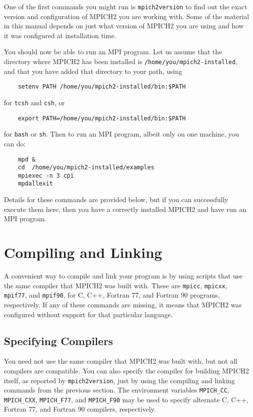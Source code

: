 \documentclass[dvipdfm,11pt]{article}
\begin{document}
One of the first commands you might run is \texttt{mpich2version} to
find out the exact version and configuration of MPICH2 you are working
with.  Some of the material in this manual depends on just what version
of MPICH2 you are using and how it was configured at installation time.

You should now be able to run an MPI program.  Let us assume that the
directory where MPICH2 has been installed is
\texttt{/home/you/mpich2-installed}, and that you have added that directory to
your path, using 
\begin{verbatim}
    setenv PATH /home/you/mpich2-installed/bin:$PATH
\end{verbatim}
for \texttt{tcsh} and \texttt{csh}, or 
\begin{verbatim}
    export PATH=/home/you/mpich2-installed/bin:$PATH
\end{verbatim}
for \texttt{bash} or \texttt{sh}.
Then to run an MPI program, albeit only on one machine, you can do:
\begin{verbatim}
    mpd &
    cd  /home/you/mpich2-installed/examples
    mpiexec -n 3 cpi
    mpdallexit
\end{verbatim}
Details for these commands are provided below, but if you can
successfully execute them here, then you have a correctly installed
MPICH2 and have run an MPI program. 

\section{Compiling and Linking}
\label{sec:compiling}

A convenient way to compile and link your program is by using scripts
that use the same compiler that MPICH2 was built with.  These are
\texttt{mpicc}, \texttt{mpicxx}, \texttt{mpif77}, and \texttt{mpif90},
for C, C++, Fortran 77, and Fortran 90 programs, respectively.  If any
of these commands are missing, it means that MPICH2 was configured
without support for that particular language.

\subsection{Specifying Compilers}
\label{sec:specifying-compilers}

You need not use the same compiler that MPICH2 was built with, but not
all compilers are compatible.  You can also specify the compiler for
building MPICH2 itself, as reported by \texttt{mpich2version}, just by
using the compiling and linking commands from the previous section.
The environment variables \texttt{MPICH\_CC}, \texttt{MPICH\_CXX},
\texttt{MPICH\_F77}, and \texttt{MPICH\_F90} may be used to specify
alternate C, C++, Fortran 77, and Fortran 90 compilers, respectively.
\end{document}
